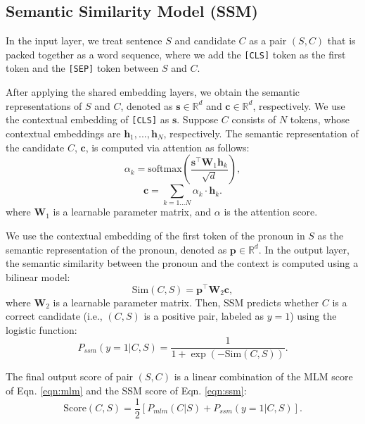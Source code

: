 \documentclass[11pt,a4paper]{article}
\begin{document}
\subsection{Semantic Similarity Model (SSM)}
\label{sec:ssm}

In the input layer, we treat sentence $S$ and candidate $C$ as a pair $(S,C)$ that is packed together as a word sequence, where we add the \texttt{[CLS]} token as the first token and the \texttt{[SEP]} token between $S$ and $C$.

After applying the shared embedding layers, we obtain the semantic representations of $S$ and $C$, denoted as $\mathbf{s}\in \mathbb{R}^d$ and $\mathbf{c} \in \mathbb{R}^d$, respectively. We use the contextual embedding of \texttt{[CLS]} as $\mathbf{s}$. Suppose $C$ consists of $N$ tokens, whose contextual embeddings are $\mathbf{h}_1,...,\mathbf{h}_N$, respectively. The semantic representation of the candidate $C$, $\mathbf{c}$, is computed via attention as follows:
\begin{equation}
\alpha_k = \text{softmax} (\frac{\mathbf{s}^\top \mathbf{W}_1 \mathbf{h}_k}{\sqrt{d}}),
\label{eqn:attn1}
\end{equation}
\begin{equation}
\mathbf{c} = \sum_{k=1...N} {\alpha_k \cdot \mathbf{h}_k}.
\label{eqn:attn2}
\end{equation}
where $\mathbf{W}_1$ is a learnable parameter matrix, and $\alpha$ is the attention score. 

We use the contextual embedding of the first token of the pronoun in $S$ as the semantic representation of the pronoun, denoted as $\mathbf{p} \in \mathbb{R}^d$. 
In the output layer, the semantic similarity between the pronoun and the context is computed using a bilinear model:
\begin{equation}
\text{Sim}(C,S) = \mathbf{p}^\top \mathbf{W}_2 \mathbf{c},
\label{eqn:ssm-m}
\end{equation}
where $\mathbf{W}_2$ is a learnable parameter matrix.
Then, SSM predicts whether $C$ is a correct candidate (i.e., $(C,S)$ is a positive pair, labeled as $y=1$) using the logistic function:
\begin{equation}
P_{ssm}(y=1|C,S) = \frac{1}{1 + \exp{(-\text{Sim}(C,S))}}.
\label{eqn:ssm}
\end{equation}

The final output score of pair $(S,C)$ is a linear combination of the MLM score of Eqn. \ref{eqn:mlm} and the SSM score of Eqn. \ref{eqn:ssm}:
\begin{equation}
\text{Score}(C,S) =\frac{1}{2} [P_{mlm}(C|S) + P_{ssm}(y=1|C,S)].
\label{eqn:score}
\end{equation}
\end{document}
